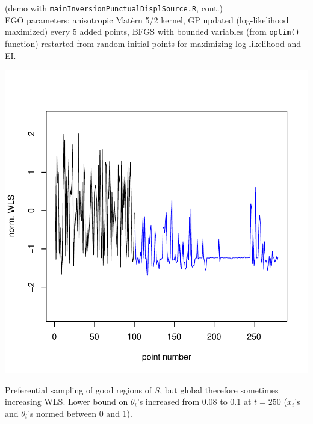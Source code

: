 \documentclass{beamer}
\begin{document}
\begin{frame}{}
\small (demo with \texttt{mainInversionPunctualDisplSource.R}, cont.)\\
\small EGO parameters: anisotropic Mat\`ern 5/2 kernel, GP updated (log-likelihood maximized) every 5 added points, BFGS with bounded variables (from \texttt{optim()} function) restarted from random initial points for maximizing log-likelihood and EI.
\begin{minipage}[c]{0.6\textwidth}
\begin{center}
\includegraphics[width=\textwidth]{figures/misfit_EGO_conv} 
\end{center}
\end{minipage}
\hspace{0.3cm}
\begin{minipage}[c]{0.3\textwidth}
Preferential sampling of good regions of $S$, but global therefore sometimes increasing WLS.
Lower bound on $\theta_i$'s increased from 0.08 to 0.1 at $t=250$ ($x_i$'s and $\theta_i$'s
normed between 0 and 1).
\end{minipage}
\end{frame}
\end{document}
